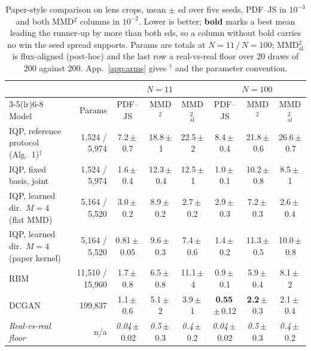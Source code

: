 \documentclass{article}
\begin{document}
\begin{table}[t]
\centering
\caption{Paper-style comparison on lens crops, mean $\pm$ sd over five seeds, PDF--JS in $10^{-3}$
and both MMD$^2$ columns in $10^{-2}$. Lower is better; \textbf{bold} marks a best mean leading the
runner-up by more than both sds, so a column without bold carries no win the seed spread supports.
Params are totals at $N{=}11\,/\,N{=}100$; MMD$^2_{\mathrm{al}}$ is flux-aligned (post-hoc) and the
last row a real-vs-real floor over $20$ draws of $200$ against $200$. App.~\ref{app:arms} gives $^{\dagger}$
and the parameter convention.}
\label{tab:main}
\scriptsize
\setlength{\tabcolsep}{2pt}
\begin{tabular}{lrcccccc}
\toprule
& & \multicolumn{3}{c}{$N = 11$} & \multicolumn{3}{c}{$N = 100$} \\
\cmidrule(lr){3-5}\cmidrule(lr){6-8}
Model & Params & PDF--JS & MMD$^2$ & MMD$^2_{\mathrm{al}}$ & PDF--JS & MMD$^2$ & MMD$^2_{\mathrm{al}}$ \\
\midrule
IQP, reference protocol (Alg.~1)$^{\dagger}$ & 1{,}524 / 5{,}974 & 7.2\,$\pm$\,0.7 & 18.8\,$\pm$\,1 & 22.5\,$\pm$\,2 & 8.4\,$\pm$\,0.4 & 21.8\,$\pm$\,0.6 & 26.6\,$\pm$\,0.7 \\
IQP, fixed basis, joint           & 1{,}524 / 5{,}974 & 1.6\,$\pm$\,0.4 & 12.3\,$\pm$\,0.4 & 12.5\,$\pm$\,1 & 1.0\,$\pm$\,0.1 & 10.2\,$\pm$\,0.8 & 8.5\,$\pm$\,1 \\
IQP, learned dir.\ $M{=}4$ (flat MMD) & 5{,}164 / 5{,}520 & 3.0\,$\pm$\,0.2 & 8.9\,$\pm$\,0.2 & 2.7\,$\pm$\,0.2 & 2.9\,$\pm$\,0.3 & 7.2\,$\pm$\,0.3 & 2.6\,$\pm$\,0.4 \\
IQP, learned dir.\ $M{=}4$ (paper kernel) & 5{,}164 / 5{,}520 & 0.81\,$\pm$\,0.05 & 9.6\,$\pm$\,0.3 & 7.4\,$\pm$\,0.6 & 1.4\,$\pm$\,0.2 & 11.3\,$\pm$\,0.5 & 10.0\,$\pm$\,0.8 \\
RBM~\cite{tieleman_2008_training}  & 11{,}510 / 15{,}960 & 1.7\,$\pm$\,0.8 & 6.5\,$\pm$\,0.8 & 11.1\,$\pm$\,4 & 0.9\,$\pm$\,0.1 & 5.9\,$\pm$\,0.4 & 8.1\,$\pm$\,2 \\
DCGAN~\cite{radford_2015_unsupervised} & 199{,}837   & 1.1\,$\pm$\,0.6 & 5.1\,$\pm$\,2 & 3.9\,$\pm$\,1 & \textbf{0.55}\,$\pm$\,0.12 & \textbf{2.2}\,$\pm$\,0.3 & 2.1\,$\pm$\,0.4 \\
\midrule
\textit{Real-vs-real floor} & n/a & \textit{0.04}\,$\pm$\,0.02 & \textit{0.5}\,$\pm$\,0.3 & \textit{0.4}\,$\pm$\,0.2 & \textit{0.04}\,$\pm$\,0.02 & \textit{0.5}\,$\pm$\,0.3 & \textit{0.4}\,$\pm$\,0.2 \\
\bottomrule
\end{tabular}
\end{table}
\end{document}
